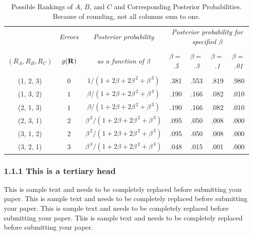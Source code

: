 \documentclass[]{asaproc}
\begin{document}
\begin{table}
\caption{\enspace Possible Rankings of $A$, $B$, and $C$ and Corresponding 
Posterior Probabilities.  Because of rounding, not all columns sum to 
one.}\label{tab1}
\begin{tabular*}{\hsize}{@{\extracolsep{\fill}}ccccccc}
\\[-5pt]
                 & 
\multicolumn{1}{c}{\it Errors} & 
\multicolumn{1}{c}{\it Posterior probability} & 
\multicolumn{4}{c}{\it Posterior probability for specified $\beta$}\\
\cline{4-7}
\\[-7pt]
\multicolumn{1}{c}{\it $(R_A,R_B,R_C)$}  & 
\multicolumn{1}{c}{\it $g({\bf R})$} & 
\multicolumn{1}{c}{\it as a function of $\beta$} & 
\multicolumn{1}{c}{\it $\beta =$ .5} & 
\multicolumn{1}{c}{\it $\beta =$ .3} & 
\multicolumn{1}{c}{\it $\beta =$ .1} & 
\multicolumn{1}{c}{\it $\beta =$ .01}\\
\hline
\\[-5pt]
(1, 2, 3)& $0$ & $1 / (1 + 2\beta + 2\beta^{\,2} + \beta^{\,3})$ & 
        .381 & .553 & .819 & .980 \\ 
(1, 3, 2)& $1$ & $\beta/ (1 + 2\beta + 2\beta^{\,2} + \beta^{\,3})$ & 
        .190 & .166 & .082 & .010 \\
(2, 1, 3)& $1$ & $\beta/ (1 + 2\beta + 2\beta^{\,2} + \beta^{\,3})$ & 
        .190 & .166 & .082 & .010 \\
(2, 3, 1)& $2$ & $\beta^{\,2}/ (1 + 2\beta + 2\beta^{\,2} + \beta^{\,3})$ & 
        .095 & .050 & .008 & .000 \\
(3, 1, 2)& $2$ & $\beta^{\,2}/ (1 + 2\beta + 2\beta^{\,2} + \beta^{\,3})$ &  
         .095 &  .050 &  .008 &  .000 \\
(3, 2, 1)& $3$ & $\beta^{\,3}/ (1 + 2\beta + 2\beta^{\,2} + \beta^{\,3})$ & 
         .048 &  .015 &  .001 &   .000 \\
\hline
\end{tabular*}
\end{table}

\subsubsection*{1.1.1 This is a tertiary head}

This is sample text and needs to be completely replaced before
submitting your paper. This is sample text and needs to be completely
replaced before submitting your paper. This is sample text and needs to
be completely replaced before submitting your paper. This is sample text
and needs to be completely replaced before submitting your paper.
\end{document}

